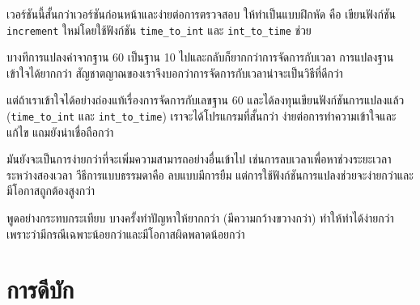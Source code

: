 เวอร์ชันนี้สั้นกว่าเวอร์ชันก่อนหน้าและง่ายต่อการตรวจสอบ ให้ทำเป็นแบบฝึกหัด คือ เขียนฟังก์ชัน {\tt increment} ใหม่โดยใช้ฟังก์ชัน \verb"time_to_int" และ \verb"int_to_time" ช่วย



บางทีการแปลงค่าจากฐาน 60 เป็นฐาน 10 ไปและกลับก็ยากกว่าการจัดการกับเวลา การแปลงฐานเข้าใจได้ยากกว่า สัญชาตญาณของเราจึงบอกว่าการจัดการกับเวลาน่าจะเป็นวิธีที่ดีกว่า


แต่ถ้าเราเข้าใจได้อย่างถ่องแท้เรื่องการจัดการกับเลขฐาน 60 และได้ลงทุนเขียนฟังก์ชันการแปลงแล้ว (\verb"time_to_int" และ \verb"int_to_time") 
เราจะได้โปรแกรมที่สั้นกว่า ง่ายต่อการทำความเข้าใจและแก้ไข แถมยังน่าเชื่อถือกว่า


มันยังจะเป็นการง่ายกว่าที่จะเพิ่มความสามารถอย่างอื่นเข้าไป เช่นการลบเวลาเพื่อหาช่วงระยะเวลาระหว่างสองเวลา 
วีธีการแบบธรรมดาคือ ลบแบบมีการยืม แต่การใช้ฟังก์ชันการแปลงช่วยจะง่ายกว่าและมีโอกาสถูกต้องสูงกว่า


พูดอย่างกระทบกระเทียบ บางครั้งทำปัญหาให้ยากกว่า (มีความกว้างขวางกว่า) ทำให้ทำได้ง่ายกว่า เพราะว่ามีกรณีเฉพาะน้อยกว่าและมีโอกาสผิดพลาดน้อยกว่า

\section{การดีบัก}

